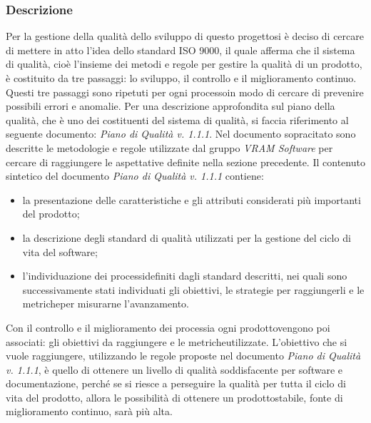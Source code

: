 \subsubsection{Descrizione}
Per la gestione della qualità dello sviluppo di questo progetto\glosp si è deciso di cercare di mettere in atto l'idea dello standard ISO 9000, il quale afferma che il sistema di qualità, cioè l'insieme dei metodi e regole per gestire la qualità di un prodotto\glo, è costituito da tre passaggi: lo sviluppo, il controllo e il miglioramento continuo. Questi tre passaggi sono ripetuti per ogni processo\glosp in modo di cercare di prevenire possibili errori e anomalie.
Per una descrizione approfondita sul piano della qualità, che è uno dei costituenti del sistema di qualità, si faccia riferimento al seguente documento: \textit{Piano di Qualità v. 1.1.1}.
Nel documento sopracitato sono descritte le metodologie e regole utilizzate dal gruppo \textit{VRAM Software} per cercare di raggiungere le aspettative definite nella sezione precedente.
Il contenuto sintetico del documento \textit{Piano di Qualità v. 1.1.1} contiene:
\begin{itemize}
	\item la presentazione delle caratteristiche e gli attributi considerati più importanti del prodotto\glo;
	\item la descrizione degli standard di qualità utilizzati per la gestione del ciclo di vita del software;
	\item l'individuazione dei processi\glosp definiti dagli standard descritti, nei quali sono successivamente stati individuati gli obiettivi, le strategie per raggiungerli e le metriche\glosp per misurarne l'avanzamento.
\end{itemize}
Con il controllo e il miglioramento dei processi\glosp a ogni prodotto\glosp vengono poi associati: gli obiettivi da raggiungere e le metriche\glosp utilizzate.
L'obiettivo che si vuole raggiungere, utilizzando le regole proposte nel documento \textit{Piano di Qualità v. 1.1.1}, è quello di ottenere un livello di qualità soddisfacente per software e documentazione, perché se si riesce a perseguire la qualità per tutta il ciclo di vita del prodotto\glo, allora le possibilità di ottenere un prodotto\glosp stabile, fonte di miglioramento continuo, sarà più alta.
